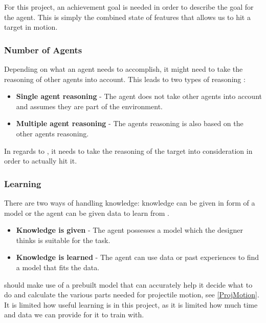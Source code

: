For this project, an achievement goal is needed in order to
describe the goal for the agent. This is simply the combined state of features
that allows us to hit a target in motion. 

\subsubsection{Number of Agents}
Depending on what an agent needs to accomplish, it might need to take the
reasoning of other agents into account. This leads to two types of reasoning
\citep[ch.1.5.6]{MIBook}:
\begin{itemize}
  \item \textbf{Single agent reasoning} - The agent does not take other
  agents into account and assumes they are part of the environment.
  \item \textbf{Multiple agent reasoning} - The agents reasoning is also based
  on the other agents reasoning.
\end{itemize}

In regards to \namep, it needs to take the reasoning of the target into
consideration in order to actually hit it.


\subsubsection{Learning}
There are two ways of handling knowledge: knowledge can be given in form of a
model or the agent can be given data to learn from \citep[ch.1.5.7]{MIBook}. 
\begin{itemize}
  \item \textbf{Knowledge is given} - The agent possesses a model which the
designer thinks is suitable for the task.
  \item \textbf{Knowledge is learned} - The agent can use data or past
  experiences to find a model that fits the data.
\end{itemize}

\name should make use of a prebuilt model that can accurately help it decide
what to do and calculate the various parts needed for projectile motion, see
\autoref{ProjMotion}. It is limited how useful learning is in this project, as
it is limited how much time and data we can provide for it to train with.

